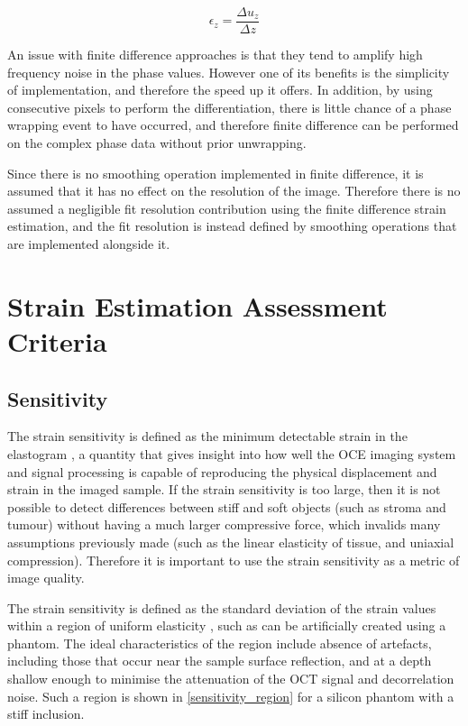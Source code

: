 \begin{equation}
	\label{fd_strain}
	\epsilon_z = \frac{\Delta u_z}{\Delta z}
\end{equation}

An issue with finite difference approaches is that they tend to amplify high frequency noise in the phase values. However one of its benefits is the simplicity of implementation, and therefore the speed up it offers. In addition, by using consecutive pixels to perform the differentiation, there is little chance of a phase wrapping event to have occurred, and therefore finite difference can be performed on the complex phase data without prior unwrapping.

Since there is no smoothing operation implemented in finite difference, it is assumed that it has no effect on the resolution of the image. Therefore there is no assumed a negligible fit resolution contribution using the finite difference strain estimation, and the fit resolution is instead defined by smoothing operations that are implemented alongside it.

\section{Strain Estimation Assessment Criteria}\label{criteria}

\subsection{Sensitivity}
The strain sensitivity is defined as the minimum detectable strain in the elastogram \cite{kennedy_strain_2012}, a quantity that gives insight into how well the OCE imaging system and signal processing is capable of reproducing the physical displacement and strain in the imaged sample. If the strain sensitivity is too large, then it is not possible to detect differences between stiff and soft objects (such as stroma and tumour) without having a much larger compressive force, which invalids many assumptions previously made (such as the linear elasticity of tissue, and uniaxial compression). Therefore it is important to use the strain sensitivity as a metric of image quality. 

The strain sensitivity is defined as the standard deviation of the strain values within a region of uniform elasticity \cite{varghese_theoretical_1997}, such as can be artificially created using a phantom. The ideal characteristics of the region include absence of artefacts, including those that occur near the sample surface reflection, and at a depth shallow enough to minimise the attenuation of the OCT signal and decorrelation noise. Such a region is shown in \autoref{sensitivity_region} for a silicon phantom with a stiff inclusion. 

